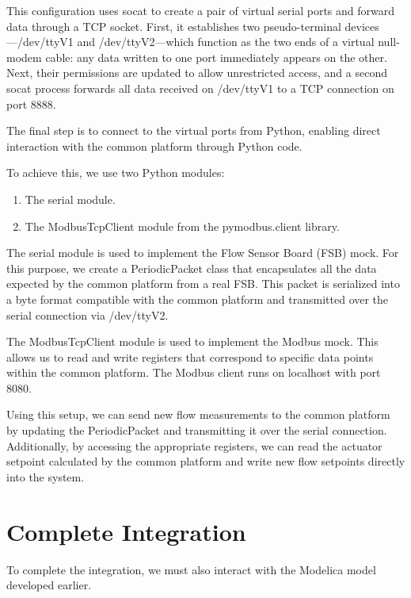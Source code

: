 \documentclass[we,final,11pt,oneside,openany]{uantwerpenbamathesis}
\begin{document}
\newpage

This configuration uses socat to create a pair of virtual serial ports and forward data through a TCP socket.
First, it establishes two pseudo-terminal devices—/dev/ttyV1 and /dev/ttyV2—which function as the two ends of a virtual null-modem cable: any data written to one port immediately appears on the other.
Next, their permissions are updated to allow unrestricted access, and a second socat process forwards all data received on /dev/ttyV1 to a TCP connection on port 8888.

The final step is to connect to the virtual ports from Python, enabling direct interaction with the common platform through Python code.

To achieve this, we use two Python modules:
\begin{enumerate}
    \item The serial module.
    \item The ModbusTcpClient module from the pymodbus.client library.
\end{enumerate}

The serial module is used to implement the Flow Sensor Board (FSB) mock.
For this purpose, we create a PeriodicPacket class that encapsulates all the data expected by the common platform from a real FSB.
This packet is serialized into a byte format compatible with the common platform and transmitted over the serial connection via /dev/ttyV2.

The ModbusTcpClient module is used to implement the Modbus mock.
This allows us to read and write registers that correspond to specific data points within the common platform.
The Modbus client runs on localhost with port 8080.

Using this setup, we can send new flow measurements to the common platform by updating the PeriodicPacket and transmitting it over the serial connection.
Additionally, by accessing the appropriate registers, we can read the actuator setpoint calculated by the common platform and write new flow setpoints directly into the system.

\newpage

\section{Complete Integration}
\label{sec:complete-integration}

To complete the integration, we must also interact with the Modelica model developed earlier.
\end{document}
